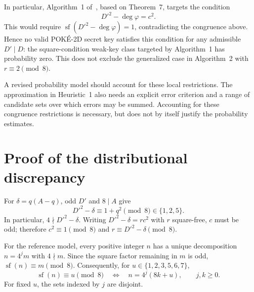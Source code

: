 \documentclass[a4paper,11pt]{article}
\theoremstyle{remark}
\DeclareMathOperator{\sfpart}{sf}
\begin{document}
In particular, Algorithm~1 of~\cite{Moriya2026}, based on Theorem~7,
targets the condition
\[
 D'^2-\deg\varphi=c^2.
\]
This would require $\sfpart(D'^2-\deg\varphi)=1$, contradicting the
congruence above. Hence no valid POK\'E-2D secret key satisfies this
condition for any admissible $D'\mid D$: the square-condition weak-key
class targeted by Algorithm~1 has probability zero.
This does not exclude the generalized case in Algorithm~2 with
$r\equiv2\pmod8$.

A revised probability model should account for these local restrictions.
The approximation in Heuristic~1 also needs an explicit error criterion
and a range of candidate sets over which errors may be summed.
Accounting for these congruence restrictions is necessary, but does not
by itself justify the probability estimates.

\appendix
\section{Proof of the distributional discrepancy}\label{app:distribution}

For $\delta=q(A-q)$, odd $D'$ and $8\mid A$ give
\[
 D'^2-\delta\equiv1+q^2\pmod8\in\{1,2,5\}.
\]
In particular, $4\nmid D'^2-\delta$. Writing $D'^2-\delta=rc^2$
with $r$ square-free, $c$ must be odd; therefore $c^2\equiv1\pmod8$
and $r\equiv D'^2-\delta\pmod8$.

For the reference model, every positive integer $n$ has a unique
decomposition $n=4^j m$ with $4\nmid m$. Since the square factor remaining
in $m$ is odd, $\sfpart(n)\equiv m\pmod8$. Consequently, for
$u\in\{1,2,3,5,6,7\}$,
\begin{equation}\label{eq:progressions}
 \sfpart(n)\equiv u\pmod8
 \quad\Longleftrightarrow\quad
 n=4^j(8k+u),\qquad j,k\ge0.
\end{equation}
For fixed $u$, the sets indexed by $j$ are disjoint.
\end{document}
